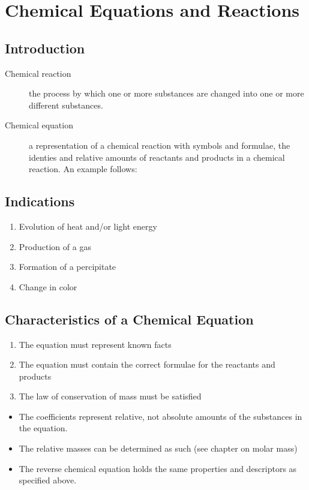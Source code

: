 \chapter{Chemical Equations and Reactions}
\section{Introduction}
\begin{description}
  \item[Chemical reaction] the process by which one or more substances are
    changed into one or more different substances.
  \item[Chemical equation] a representation of a chemical reaction with symbols
    and formulae, the identies and relative amounts of reactants and products in
    a chemical reaction.  An example follows: 
\end{description}

\section{Indications}
\begin{enumerate}
  \item Evolution of heat and/or light energy
  \item Production of a gas
  \item Formation of a percipitate
  \item Change in color
\end{enumerate}

\section{Characteristics of a Chemical Equation}
\begin{enumerate}
  \item The equation must represent known facts
  \item The equation must contain the correct formulae for the reactants and
    products
  \item The law of conservation of mass must be satisfied
\end{enumerate}

\begin{itemize}
  \item The coefficients represent relative, not absolute amounts of the
    substances in the equation.
  \item The relative masses can be determined as such (see chapter on molar
    mass)
  \item The reverse chemical equation holds the same properties and descriptors
    as specified above.
\end{itemize}

